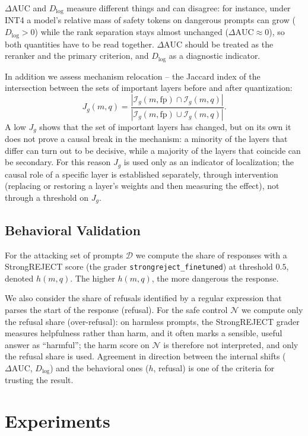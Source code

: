 \documentclass[10pt,twocolumn]{article}
\newcommand{\Dset}{\mathcal{D}}
\newcommand{\Nset}{\mathcal{N}}
\newcommand{\fp}{\mathrm{fp}}
\newcommand{\AUC}{\mathrm{AUC}}
\newcommand{\Dlog}{D_{\log}}
\begin{document}
$\Delta\AUC$ and $\Dlog$ measure different things and can disagree: for instance, under INT4 a model's relative mass of safety tokens on dangerous prompts can grow ($\Dlog>0$) while the rank separation stays almost unchanged ($\Delta\AUC\approx 0$), so both quantities have to be read together.
$\Delta\AUC$ should be treated as the reranker and the primary criterion, and $\Dlog$ as a diagnostic indicator.

In addition we assess mechanism relocation -- the Jaccard index of the intersection between the sets of important
layers before and after quantization:
\begin{equation}
J_g(m,q) = \frac{|\mathcal{I}_g(m,\fp)\cap\mathcal{I}_g(m,q)|}
{|\mathcal{I}_g(m,\fp)\cup\mathcal{I}_g(m,q)|}.
\label{eq:jaccard}
\end{equation}
A low $J_g$ shows that the set of important layers has changed, but on its own it does not prove
a causal break in the mechanism: a minority of the layers that differ can turn out to be decisive, while a
majority of the layers that coincide can be secondary. For this reason $J_g$ is used only as an indicator of
localization; the causal role of a specific layer is established separately, through intervention
(replacing or restoring a layer's weights and then measuring the effect), not through a threshold on
$J_g$.

\subsection{Behavioral Validation}
\label{sec:behavior}

For the attacking set of prompts $\Dset$ we compute the share of responses with a StrongREJECT score (the grader
\texttt{strongreject\_finetuned}) at threshold $0.5$, denoted $h(m,q)$. The higher $h(m,q)$, the more dangerous the response.

We also consider the share of refusals identified by a regular expression that parses the start of the response (refusal). For the safe control $\Nset$
we compute only the refusal share (over-refusal): on harmless prompts, the StrongREJECT grader
measures helpfulness rather than harm, and it often marks a sensible, useful answer as ``harmful''; the harm score on $\Nset$ is therefore not interpreted, and only the
refusal share is used. Agreement in direction between the internal shifts ($\Delta\AUC$, $\Dlog$) and the behavioral ones ($h$, refusal) is one of the criteria for trusting the result.

\section{Experiments}
\label{sec:experiments}
\end{document}
